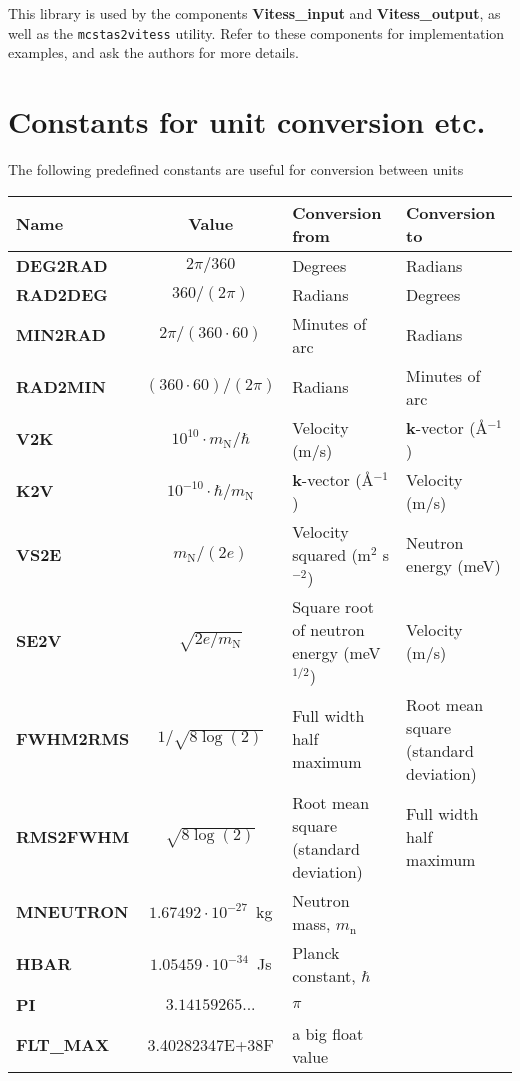 This library is used by the components
\textbf{Vitess\_input} and \textbf{Vitess\_output},
as well as the \verb+mcstas2vitess+ utility.
Refer to these components for implementation examples, and ask the authors for more details.

\section{Constants for unit conversion etc.}
The following predefined constants are useful for conversion
between units
\def\textvb#1{\textbf{#1}\index{#1 (constant)@\texttt{#1} (constant)|textbf}}
\begin{center}
\begin{tabular}{|l|c|p{}|p{}|}
\hline
Name & Value & Conversion from & Conversion to \\ \hline
\textvb{DEG2RAD} & $2 \pi / 360$ & Degrees & Radians \\
\textvb{RAD2DEG} & $360 / (2 \pi)$ & Radians & Degrees \\
\textvb{MIN2RAD} & $2 \pi / (360 \cdot 60)$
  & Minutes of arc & Radians \\
\textvb{RAD2MIN} & $(360\cdot 60) / (2 \pi)$
  & Radians & Minutes of arc \\
\textvb{V2K} & $10^{10} \cdot m_\mathrm{N}/\hbar$
  & Velocity (m/s) & \textbf{k}-vector (\AA$^{-1}$) \\
\textvb{K2V} & $10^{-10} \cdot \hbar / m_\mathrm{N}$
  & \textbf{k}-vector (\AA$^{-1}$) & Velocity (m/s) \\
\textvb{VS2E} & $m_\mathrm{N} / (2 e)$
  & Velocity squared (m$^2$ s$^{-2}$) & Neutron energy (meV) \\
\textvb{SE2V} & $\sqrt{2 e/m_\mathrm{N}}$
  & Square root of neutron energy (meV$^{1/2}$) & Velocity (m/s) \\
\textvb{FWHM2RMS} & $1/\sqrt{8\log(2)}$
  & Full width half maximum & Root mean square (standard deviation) \\
\textvb{RMS2FWHM} & $\sqrt{8\log(2)}$
  & Root mean square (standard deviation) & Full width half maximum \\
\textvb{MNEUTRON} & $1.67492 \cdot 10^{-27}$~kg
  & Neutron mass, $m_\mathrm{n}$ & \\
\textvb{HBAR} & $1.05459 \cdot 10^{-34}$~Js
  & Planck constant, $\hbar$ & \\
\textvb{PI} & $3.14159265...$
  & $\pi$ & \\
\textvb{FLT\_MAX} & 3.40282347E+38F
  & a big float value & \\
\hline
\end{tabular}
\end{center}
